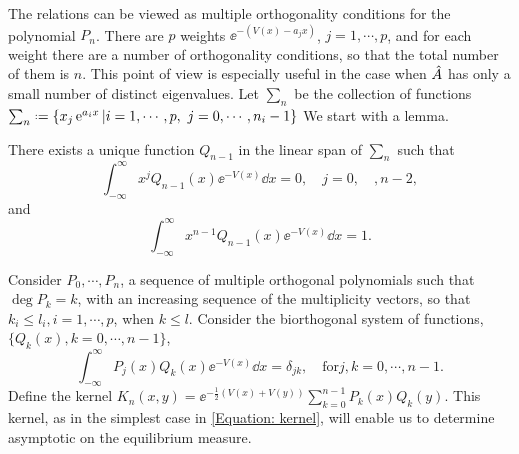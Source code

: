 The relations can be viewed as multiple orthogonality conditions for the polynomial $P_n$. There are $p$ weights $\ee^{-(V (x)-a_jx)}$, $j = 1, \cdots , p$, and for each weight there are a number of orthogonality conditions, so that the total number of them is $n$. This point of view is especially useful in the case when $\hat A$ has only a small number of distinct eigenvalues. Let $\sum_n$ be the collection of functions 
$
\sum_n \deff \{ x_j \ee^{a_i x} | i = 1, \cdots , p, \ j = 0, \cdots , n_i - 1 \}
$
We start with a lemma.
\begin{lemma}
	There exists a unique function $Q_{n-1}$ in the linear span of $\sum_n$ such that
	\begin{equation}
		\int_{-\infty}^{\infty} x^j Q_{n-1}(x) \ee^{-V(x)} \dd x = 0, \quad j = 0, \quad , n-2,
	\end{equation}
	 and 
	 \begin{equation}
	 	\int_{-\infty}^{\infty} x^{n-1} Q_{n-1}(x) \ee^{-V(x)} \dd x = 1. 
	 \end{equation}
\end{lemma}
Consider $P_0, \cdots, P_n$, a sequence of multiple orthogonal polynomials such that $\deg P_k = k$, with an increasing sequence of the multiplicity vectors, so that $k_i \leq l_i, i = 1, \cdots , p$, when $k \leq l$. Consider the biorthogonal system of functions, $\{ Q_k(x), k = 0, \cdots , n-1\}$, 
\begin{equation}
	\int_{-\infty}^{\infty} P_j(x) Q_k(x) \ee^{-V(x)} \dd x = \delta_{jk}, \quad \text{for} j, k = 0, \cdots , n-1. 
\end{equation}
Define the kernel 
$
	K_n(x, y) = \ee^{-\frac{1}{2}(V(x)+V(y))}  \sum^{n-1}_{k=0} P_k(x)Q_k(y). 
$
This kernel, as in the simplest case in \eqref{Equation: kernel}, will enable us to determine asymptotic on the equilibrium measure.
